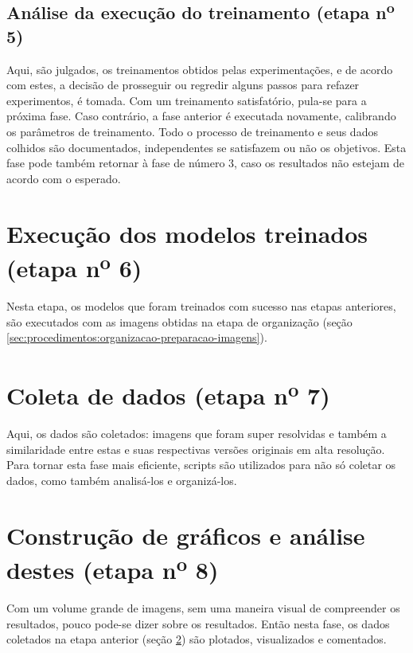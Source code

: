 \subsection{Análise da execução do treinamento (etapa n\textsuperscript{o} 5)}

Aqui, são julgados, os treinamentos obtidos pelas experimentações, e de acordo com estes, a decisão de prosseguir ou regredir alguns passos para refazer experimentos, é tomada. Com um treinamento satisfatório, pula-se para a próxima fase. Caso contrário, a fase anterior é executada novamente, calibrando os parâmetros de treinamento. Todo o processo de treinamento e seus dados colhidos são documentados, independentes se satisfazem ou não os objetivos. Esta fase pode também retornar à fase de número 3, caso os resultados não estejam de acordo com o esperado.

\section{Execução dos modelos treinados (etapa n\textsuperscript{o} 6)}
\label{sec:procedimentos:execucao-modelo-treinado}

Nesta etapa, os modelos que foram treinados com sucesso nas etapas anteriores, são executados com as imagens obtidas na etapa de organização (seção \ref{sec:procedimentos:organizacao-preparacao-imagens}).

\section{Coleta de dados (etapa n\textsuperscript{o} 7)}
\label{sec:procedimentos:coleta-dados}

Aqui, os dados são coletados: imagens que foram super resolvidas e também a similaridade entre estas e suas respectivas versões originais em alta resolução. Para tornar esta fase mais eficiente, scripts são utilizados para não só coletar os dados, como também analisá-los e organizá-los.

\section{Construção de gráficos e análise destes (etapa n\textsuperscript{o} 8)}
\label{sec:procedimentos:graficos-analise}

Com um volume grande de imagens, sem uma maneira visual de compreender os resultados, pouco pode-se dizer sobre os resultados. Então nesta fase, os dados coletados na etapa anterior (seção \ref{sec:procedimentos:coleta-dados}) são plotados, visualizados e comentados. 




